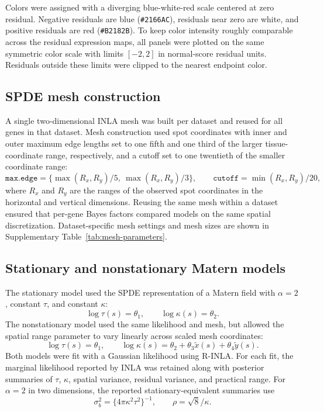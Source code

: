 Colors were assigned with a diverging blue-white-red scale centered at zero residual. Negative residuals are blue (\texttt{\#2166AC}), residuals near zero are white, and positive residuals are red (\texttt{\#B2182B}). To keep color intensity roughly comparable across the residual expression maps, all panels were plotted on the same symmetric color scale with limits \([-2,2]\) in normal-score residual units. Residuals outside these limits were clipped to the nearest endpoint color.

\subsection{SPDE mesh construction}
A single two-dimensional INLA mesh was built per dataset and reused for all genes in that dataset. Mesh construction used spot coordinates with inner and outer maximum edge lengths set to one fifth and one third of the larger tissue-coordinate range, respectively, and a cutoff set to one twentieth of the smaller coordinate range:
\[
\texttt{max.edge} = \{\max(R_x,R_y)/5,\ \max(R_x,R_y)/3\}, \qquad
\texttt{cutoff} = \min(R_x,R_y)/20,
\]
where \(R_x\) and \(R_y\) are the ranges of the observed spot coordinates in the horizontal and vertical dimensions. Reusing the same mesh within a dataset ensured that per-gene Bayes factors compared models on the same spatial discretization. Dataset-specific mesh settings and mesh sizes are shown in Supplementary Table~\ref{tab:mesh-parameters}.

\subsection{Stationary and nonstationary Matern models}
The stationary model used the SPDE representation of a Matern field with \(\alpha = 2\), constant \(\tau\), and constant \(\kappa\):
\[
\log \tau(s) = \theta_1, \qquad \log \kappa(s) = \theta_2.
\]
The nonstationary model used the same likelihood and mesh, but allowed the spatial range parameter to vary linearly across scaled mesh coordinates:
\[
\log \tau(s) = \theta_1, \qquad
\log \kappa(s) = \theta_2 + \theta_3 \tilde{x}(s) + \theta_4 \tilde{y}(s).
\]
Both models were fit with a Gaussian likelihood using R-INLA. For each fit, the marginal likelihood reported by INLA was retained along with posterior summaries of \(\tau\), \(\kappa\), spatial variance, residual variance, and practical range. For \(\alpha=2\) in two dimensions, the reported stationary-equivalent summaries use
\[
\sigma_b^2 = \{4\pi \kappa^2\tau^2\}^{-1}, \qquad
\rho = \sqrt{8}/\kappa .
\]

